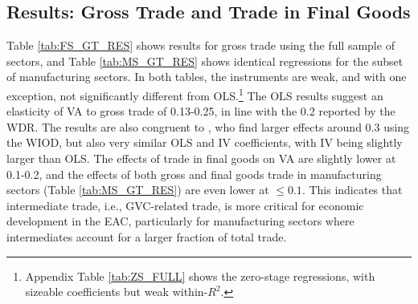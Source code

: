 \documentclass[a4paper]{article}
\begin{document}
\subsection{Results: Gross Trade and Trade in Final Goods}

Table \ref{tab:FS_GT_RES} shows results for gross trade using the full sample of sectors, and Table \ref{tab:MS_GT_RES} shows identical regressions for the subset of manufacturing sectors. In both tables, the instruments are weak, and with one exception, not significantly different from OLS.\footnote{Appendix Table \ref{tab:ZS_FULL} shows the zero-stage regressions, with sizeable coefficients but weak within-$R^2$. } The OLS results suggest an elasticity of VA to gross trade of 0.13-0.25, in line with the 0.2 reported by the WDR. The results are also congruent to \citet{altomonte2018trade}, who find larger effects around 0.3 using the WIOD, but also very similar OLS and IV coefficients, with IV being slightly larger than OLS. The effects of trade in final goods on VA are slightly lower at 0.1-0.2, and the effects of both gross and final goods trade in manufacturing sectors (Table \ref{tab:MS_GT_RES}) are even lower at $\leq 0.1$. This indicates that intermediate trade, i.e., GVC-related trade, is more critical for economic development in the EAC, particularly for manufacturing sectors where intermediates account for a larger fraction of total trade. 
\end{document}
